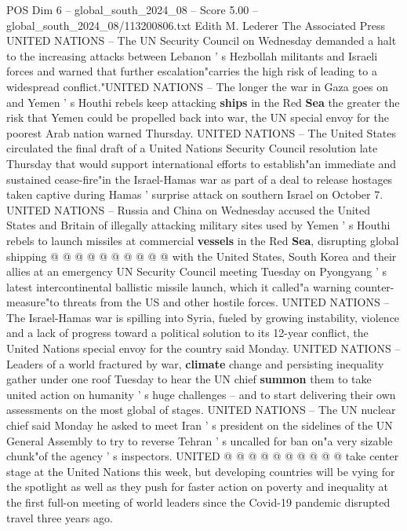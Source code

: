 \begin{textsample}{POS Dim 6 – global\_south\_2024\_08 – Score 5.00 – global\_south\_2024\_08/113200806.txt}  \label{ex:f6_pos_329}
Edith M.
Lederer The Associated Press UNITED NATIONS -- The UN Security Council on Wednesday demanded a halt to the increasing attacks between Lebanon ' s Hezbollah militants and Israeli forces and warned that further escalation"carries the high risk of leading to a widespread conflict."UNITED NATIONS -- The longer the war in Gaza goes on and Yemen ' s Houthi rebels keep attacking \textbf{ships} in the Red \textbf{Sea} the greater the risk that Yemen could be propelled back into war, the UN special envoy for the poorest Arab nation warned Thursday.
UNITED NATIONS -- The United States circulated the final draft of a United Nations Security Council resolution late Thursday that would support international efforts to establish"an immediate and sustained cease-fire"in the Israel-Hamas war as part of a deal to release hostages taken captive during Hamas ' surprise attack on southern Israel on October 7.
UNITED NATIONS -- Russia and China on Wednesday accused the United States and Britain of illegally attacking military sites used by Yemen ' s Houthi rebels to launch missiles at commercial \textbf{vessels} in the Red \textbf{Sea}, disrupting global shipping @ @ @ @ @ @ @ @ @ @ with the United States, South Korea and their allies at an emergency UN Security Council meeting Tuesday on Pyongyang ' s latest intercontinental ballistic missile launch, which it called"a warning counter-measure"to threats from the US and other hostile forces.
UNITED NATIONS -- The Israel-Hamas war is spilling into Syria, fueled by growing instability, violence and a lack of progress toward a political solution to its 12-year conflict, the United Nations special envoy for the country said Monday.
UNITED NATIONS -- Leaders of a world fractured by war, \textbf{climate} change and persisting inequality gather under one roof Tuesday to hear the UN chief \textbf{summon} them to take united action on humanity ' s huge challenges -- and to start delivering their own assessments on the most global of stages.
UNITED NATIONS -- The UN nuclear chief said Monday he asked to meet Iran ' s president on the sidelines of the UN General Assembly to try to reverse Tehran ' s uncalled for ban on"a very sizable chunk"of the agency ' s inspectors.
UNITED @ @ @ @ @ @ @ @ @ @ take center stage at the United Nations this week, but developing countries will be vying for the spotlight as well as they push for faster action on poverty and inequality at the first full-on meeting of world leaders since the Covid-19 pandemic disrupted travel three years ago.

\end{textsample}
